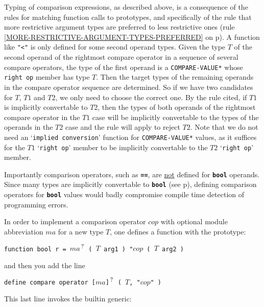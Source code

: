 \documentclass[12pt]{article}
\newcommand{\TT}[1]{{\tt \bfseries #1}}
\newcommand{\pagref}[1]{p\pageref{#1}}
\newcommand{\QMARK}{{$^{\,\mbox{\footnotesize ?}}$}}
\begin{document}
Typing of comparison expressions, as described above, is a
consequence of the rules for matching function calls to
prototypes, and specifically of the rule that more restrictive
argument types are preferred to less restrictive ones
(rule \ref{MORE-RESTRICTIVE-ARGUMENT-TYPES-PREFERRED} on
\pagref{MORE-RESTRICTIVE-ARGUMENT-TYPES-PREFERRED}).
A function like {\tt "<"} is only defined for
some second operand types.  Given the type $T$ of the second operand
of the rightmost compare operator in a sequence of several compare operators,
the type of the first operand is a {\tt *COMPARE-VALUE*}
whose {\tt right op} member has type $T$.  Then the target types
of the remaining operands in the compare operator sequence are determined.
So if we have two candidates
for $T$, $T1$ and $T2$, we only need to choose the correct one.
By the rule cited, if $T1$ is implicitly convertable to $T2$, then
the types of both operands of the rightmost compare operator
in the $T1$ case will be
implicitly convertable to the types of the operands in the $T2$ case
and the rule will apply to reject $T2$.  Note that we do not need
an `{\tt implied conversion}' function for {\tt *COMPARE-VALUE*}
values, as it suffices for the $T1$ `{\tt right op}' member to be
implicitly convertable to the $T2$ `{\tt right op}' member.

Importantly comparison operators, such as \TT{==}, are
\underline{not} defined for \TT{bool} operands.  Since many
types are implicitly convertable to \TT{bool}
(see \pagref{IMPLIED-BOOL-CONVERSION}), defining comparison
operators for \TT{bool} values would badly compromise compile time
detection of programming errors.

In order to implement a comparison operator $cop$ with optional
module abbreviation $ma$ for a new
type $T$, one defines a function with the prototype:
\begin{center}
\tt function bool r = $ma$\QMARK{} ( $T$ arg1 ) "$cop$ ( $T$ arg2 )
\end{center}
and then you add the line
\begin{center}
\tt define compare operator [$ma$]\QMARK{} ( $T$, "$cop$" )
\end{center}
This last line invokes the builtin generic:
\end{document}
